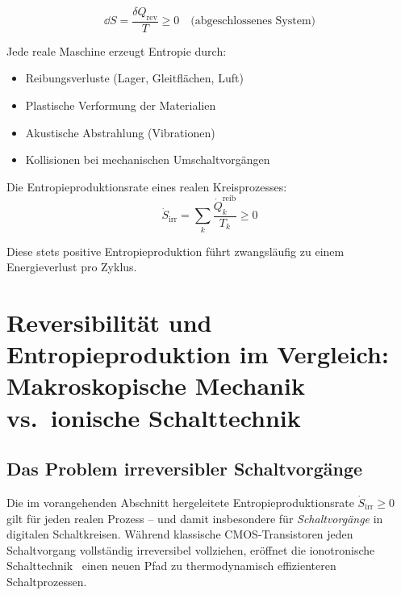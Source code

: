 ﻿\documentclass[12pt, a4paper]{report}
\theoremstyle{definition}
\theoremstyle{remark}
\begin{document}
\begin{equation}
  \dd S = \frac{\delta Q_{\text{rev}}}{T} \geq 0 \quad \text{(abgeschlossenes System)}
  \label{eq:entropie}
\end{equation}

Jede reale Maschine erzeugt Entropie durch:
\begin{itemize}
  \item Reibungsverluste (Lager, Gleitflächen, Luft)
  \item Plastische Verformung der Materialien
  \item Akustische Abstrahlung (Vibrationen)
  \item Kollisionen bei mechanischen Umschaltvorgängen
\end{itemize}

Die Entropieproduktionsrate eines realen Kreisprozesses:
\begin{equation}
  \dot{S}_{\text{irr}} = \sum_k \frac{\dot{Q}_k^{\text{reib}}}{T_k} \geq 0
  \label{eq:entropieprod}
\end{equation}

Diese stets positive Entropieproduktion führt zwangsläufig zu einem
Energieverlust pro Zyklus.

\section[Reversibilität und Entropieproduktion im Vergleich]{Reversibilität und Entropieproduktion im Vergleich:\\[2pt]
         Makroskopische Mechanik vs.\ ionische Schalttechnik}
\label{ssec:entropie_vergleich}

\subsection{Das Problem irreversibler Schaltvorgänge}

Die im vorangehenden Abschnitt hergeleitete Entropieproduktionsrate
$\dot{S}_\text{irr} \geq 0$ gilt für jeden realen Prozess -- und damit
insbesondere für \emph{Schaltvorgänge} in digitalen Schaltkreisen. Während
klassische CMOS-Transistoren jeden Schaltvorgang vollständig irreversibel
vollziehen, eröffnet die ionotronische Schalttechnik~\cite{ionotronik2026}
einen neuen Pfad zu thermodynamisch effizienteren Schaltprozessen.
\end{document}
